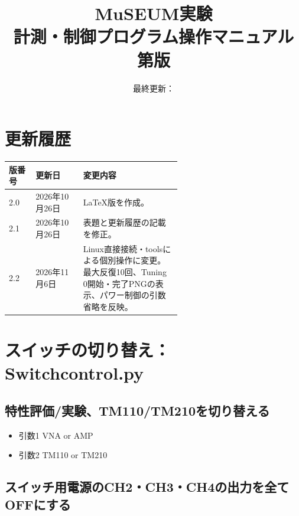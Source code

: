 \documentclass[a4paper,11pt]{ltjsarticle}
\title{MuSEUM実験\\計測・制御プログラム操作マニュアル\\[0.5em]\large 第\documentversion 版}
\author{}
\date{最終更新：\documentupdated}
\begin{document}
\maketitle
\section*{更新履歴}
\begin{tabular}{@{}llp{0.58\linewidth}@{}}
\hline
版番号 & 更新日 & 変更内容 \\
\hline
2.0 & 2026年10月26日 & LaTeX版を作成。 \\
2.1 & 2026年10月26日 & 表題と更新履歴の記載を修正。 \\
2.2 & 2026年11月6日 & Linux直接接続・toolsによる個別操作に変更。最大反復10回、Tuning 0開始・完了PNGの表示、パワー制御の引数省略を反映。 \\
\hline
\end{tabular}
\clearpage
\tableofcontents
\clearpage


\section{スイッチの切り替え：Switchcontrol.py}

\subsection{特性評価/実験、TM110/TM210を切り替える}

\begin{command}


\end{command}

\begin{itemize}

\item 引数1 VNA or AMP

\item 引数2 TM110 or TM210

\end{itemize}

\subsection{スイッチ用電源のCH2・CH3・CH4の出力を全てOFFにする}

\begin{command}


\end{command}
\end{document}

